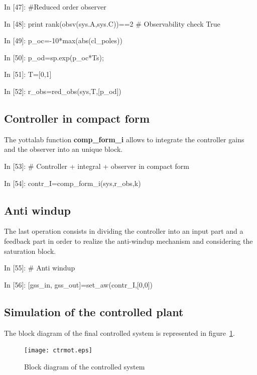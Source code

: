 \begin{code}
In [47]: #Reduced order observer

In [48]: print rank(obsv(sys.A,sys.C))==2     # Observability check
True

In [49]: p_oc=-10*max(abs(cl_poles))

In [50]: p_od=sp.exp(p_oc*Ts);

In [51]: T=[0,1]

In [52]: r_obs=red_obs(sys,T,[p_od])
\end{code}

\subsection{Controller in compact form}

The yottalab function \textbf{comp\_form\_i} allows to integrate the controller 
gains and the observer into an unique block.

\begin{code}
In [53]: # Controller + integral + observer in compact form

In [54]: contr_I=comp_form_i(sys,r_obs,k)
\end{code}

\subsection{Anti windup}

The last operation consists in  dividing the controller into an input part and 
a feedback 
part in order to realize the anti-windup mechanism and considering the 
saturation block.

\begin{code}
In [55]: # Anti windup

In [56]: [gss_in, gss_out]=set_aw(contr_I,[0,0])
\end{code}

\subsection{Simulation of the controlled plant}

The block diagram of the final controlled system is represented in 
figure~\ref{F16}.

\begin{figure}[htbp]	%
\centering
\texttt{[image: ctrmot.eps]}
\caption{Block diagram of the controlled system}
\label{F16}
\end{figure}

